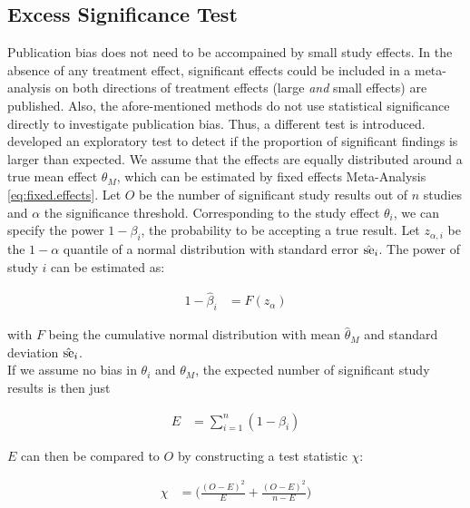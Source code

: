 \documentclass[11pt,a4paper,twoside]{book}\usepackage[]{graphicx}\usepackage[]{color}
\begin{document}
\subsection{Excess Significance Test} \label{sec:excess.significance}
Publication bias does not need to be accompained by small study effects. In the absence of any treatment effect, significant effects could be included in a meta-analysis on both directions of treatment effects (\ie large \textit{and} small effects) are published. Also, the afore-mentioned methods do not use statistical significance directly to investigate publication bias. Thus, a different test is introduced. \\
\citet{excess.significance} developed an exploratory test to detect if the proportion of significant findings is larger than expected. 
We assume that the effects are equally distributed around a true mean effect $\theta_M$, which can be estimated by fixed effects Meta-Analysis \eqref{eq:fixed.effects}. Let $O$ be the number of significant study results out of $n$ studies and $\alpha$ the significance threshold. Corresponding to the study effect $\theta_i$, we can specify the power $1 - \beta_i$, the probability to be accepting a true result. Let $z_{\alpha,i}$ be the $1-\alpha$ quantile of a normal distribution with standard error $\hat{\operatorname{se}}_i$. The power of study $i$ can be estimated as:

\begin{align}
1 - \hat{\beta}_i &= F(z_\alpha) 
\end{align}

with $F$ being the cumulative normal distribution with mean $\hat{\theta}_M$ and standard deviation $\hat{\operatorname{se}}_i$. \\
If we assume no bias in $\theta_i$ and $\theta_M$, the expected number of significant study results is then just

\begin{align}
E &= \sum_{i = 1}^n (1 - \beta_i) \nonumber
\end{align}

$E$ can then be compared to $O$ by constructing a test statistic $\chi$:

\begin{align}
\chi  &= \bigg( \frac{(O - E)^2}{E} + \frac{(O - E)^2}{n - E}\bigg) \nonumber
\end{align}
\end{document}
